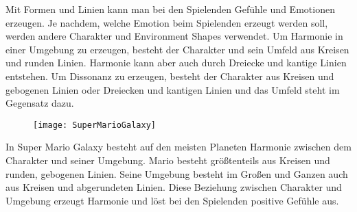 Mit Formen und Linien kann man bei den Spielenden Gefühle und Emotionen erzeugen. Je nachdem, welche Emotion beim Spielenden erzeugt werden soll, werden andere Charakter und Environment Shapes verwendet. Um Harmonie in einer Umgebung zu erzeugen, besteht der Charakter und sein Umfeld aus Kreisen und runden Linien. Harmonie kann aber auch durch Dreiecke und kantige Linien entstehen. Um Dissonanz zu erzeugen, besteht der Charakter aus Kreisen und gebogenen Linien oder Dreiecken und kantigen Linien und das Umfeld steht im Gegensatz dazu.
\cite{solarski2012drawing}

\begin{figure}[H]
	\centering
	\texttt{[image: SuperMarioGalaxy]}
	\caption{\cite{solarski2012drawing}}
\end{figure}

In Super Mario Galaxy besteht auf den meisten Planeten Harmonie zwischen dem Charakter und seiner Umgebung. Mario besteht größtenteils aus Kreisen und runden, gebogenen Linien. Seine Umgebung besteht im Großen und Ganzen auch aus Kreisen und abgerundeten Linien. Diese Beziehung zwischen Charakter und Umgebung erzeugt Harmonie und löst bei den Spielenden positive Gefühle aus. 
\cite{solarski2012drawing}



